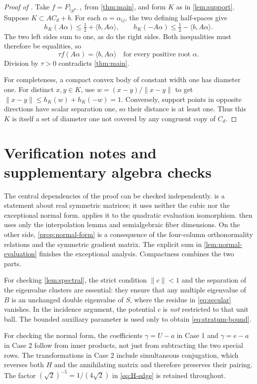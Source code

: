 \documentclass[11pt,reqno]{amsart}
\theoremstyle{definition}
\theoremstyle{remark}
\numberwithin{equation}{section}
\newcommand{\ip}[2]{\langle #1,#2\rangle}
\newcommand{\norm}[1]{\lVert #1\rVert}
\begin{document}
\begin{proof}[Proof of ]
Take $f=F|_{S^{d-1}}$ from \cref{thm:main}, and form $K$ as in
\cref{lem:support}. Suppose $K\subset A C_d+b$.
For each $\alpha=\alpha_{ij}$, the two defining half-spaces give
\[
 h_K(A\alpha)\leq\tfrac12+\ip b{A\alpha},\qquad
 h_K(-A\alpha)\leq\tfrac12-\ip b{A\alpha}.
\]
The two left sides sum to one, as do the right sides. Both
inequalities must therefore be equalities, so
\[
 \tau f(A\alpha)=\ip b{A\alpha}
 \quad\text{for every positive root }\alpha.
\]
Division by $\tau>0$ contradicts \cref{thm:main}.

For completeness, a compact convex body of constant width one has
diameter one. For distinct $x,y\in K$, use
$w=(x-y)/\norm{x-y}$ to get
$\norm{x-y}\leq h_K(w)+h_K(-w)=1$.
Conversely, support points in opposite directions have scalar
separation one, so their distance is at least one. Thus this $K$
is itself a set of diameter one not covered by any congruent copy
of $C_d$.
\end{proof}

\appendix
\section{Verification notes and supplementary algebra checks}
\label{app:verification}

The central dependencies of the proof can be checked independently.
 is a statement about real symmetric matrices;
it uses neither the cubic nor the exceptional normal form.
 applies it to the quadratic evaluation
isomorphism.  then uses only the interpolation
lemma and semialgebraic fiber dimensions. On the other side,
\cref{prop:normal-form} is a consequence of the four-column
orthonormality relations and the symmetric gradient matrix.
The explicit sum in \cref{lem:normal-evaluation} finishes the
exceptional analysis. Compactness combines the two parts.

For checking \cref{lem:spectral}, the strict condition $\norm c<1$
and the separation of the eigenvalue clusters are essential: they
ensure that any multiple eigenvalue of $B$ is an unchanged double
eigenvalue of $S$, where the residue in \eqref{eq:secular} vanishes.
In the incidence argument, the potential $c$ is \emph{not} restricted
to that unit ball. The bounded auxiliary parameter is used only
to obtain \eqref{eq:stratum-bound}.

For checking the normal form, the coefficients
$\gamma=U-a$ in Case 1 and $\gamma=e-a$ in Case 2 follow from
inner products, not just from subtracting the two special rows.
The transformations in Case 2 include simultaneous conjugation,
which reverses both $H$ and the annihilating matrix and therefore
preserves their pairing. The factor $(\sqrt2)^{-5}=1/(4\sqrt2)$
in \eqref{eq:H-edge} is retained throughout.
\end{document}
